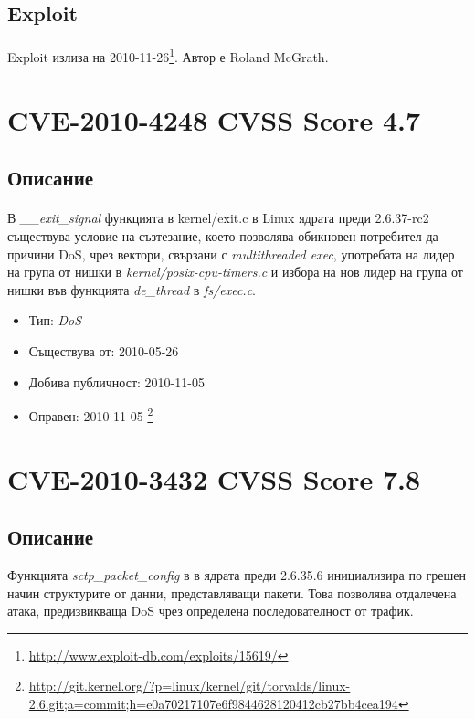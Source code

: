 \documentclass[a4paper,12pt,leqno]{article}
\begin{document}
\subsection{Exploit}
\paragraph{}
Exploit излиза на 2010-11-26\footnote{\url{http://www.exploit-db.com/exploits/15619/}}. Автор е Roland McGrath.


\section{CVE-2010-4248 CVSS Score 4.7}
\subsection{Описание}
\paragraph{}
В \textit{\_\_exit\_signal} функцията в kernel/exit.c в Linux ядрата преди  2.6.37-rc2 съществува условие на съзтезание, което позволява обикновен потребител да причини DoS, чрез вектори, свързани с \textit{multithreaded exec}, употребата на лидер на група от нишки в \textit{kernel/posix-cpu-timers.c} и избора на нов лидер на група от нишки във функцията \textit{de\_thread} в \textit{fs/exec.c}.

\begin{itemize}
    \item Тип: \textit{DoS}
    \item Съществува от: 2010-05-26
  	\item Добива публичност: 2010-11-05
    \item Оправен: 2010-11-05 \footnote{\url{http://git.kernel.org/?p=linux/kernel/git/torvalds/linux-2.6.git;a=commit;h=e0a70217107e6f9844628120412cb27bb4cea194}}
\end{itemize}

\section{CVE-2010-3432 CVSS Score 7.8} %
\label{sec:CVE-2010-3432 Score 7.8}
\subsection{Описание}
Функцията \textit{sctp\_packet\_config} в  в ядрата преди 2.6.35.6 инициализира по
грешен начин структурите от данни, представляващи пакети. Това позволява отдалечена атака, предизвикваща DoS чрез определена последователност от  трафик.
\end{document}

